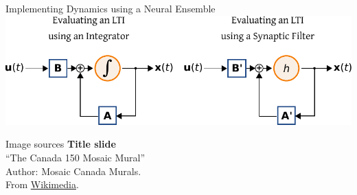\documentclass[handout,aspectratio=169]{beamer}
\begin{document}
	\begin{frame}{Implementing Dynamics using a Neural Ensemble}
		\centering
		\includegraphics[width=\textwidth]{media/lti_integrator_vs_neural.pdf} 
	\end{frame}

	\backupbegin
	
	\begin{frame}[noframenumbering]{Image sources}
		\small
		\textbf{Title slide}\\\enquote{The Canada 150 Mosaic Mural}\\Author: Mosaic Canada Murals.\\From \href{https://commons.wikimedia.org/wiki/File:Canada_150_Mosaic_Engine.jpg}{Wikimedia}.
	\end{frame}


	\backupend
	
\end{document}
